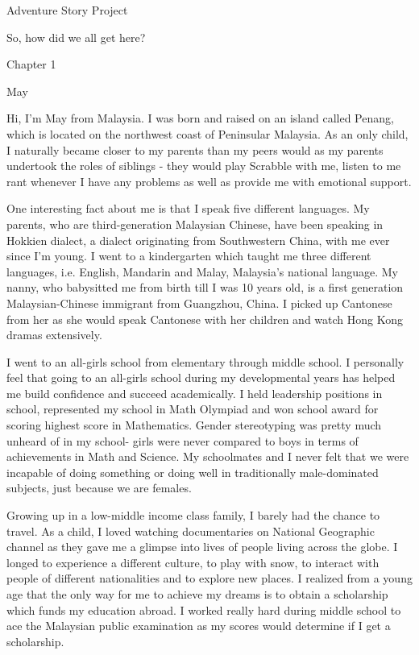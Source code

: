 \documentclass{article}
\begin{document}
\Huge Adventure Story Project

So, how did we all get here?

Chapter 1

May

Hi, I'm May from Malaysia. I was born and raised on an island called Penang, which is located on the northwest coast of Peninsular  Malaysia. As an only child, I naturally became closer to my parents than my peers would as my parents undertook the roles of siblings - they would play Scrabble with me, listen to me rant whenever I have any problems as well as provide me with emotional support. 

One interesting fact about me is that I speak five different languages. My parents, who are third-generation Malaysian Chinese, have been speaking in Hokkien dialect, a dialect originating from Southwestern China,  with me ever since I’m young. I went to a kindergarten which taught me three different languages, i.e. English, Mandarin and Malay, Malaysia’s national language. My nanny, who babysitted me from birth till I was 10 years old, is a first generation Malaysian-Chinese immigrant from Guangzhou, China.  I picked up Cantonese from her as she would speak Cantonese with her children and watch Hong Kong dramas extensively. 

I went to an all-girls school from elementary through middle school. I personally feel that going to an all-girls school during my developmental years has helped me build confidence and succeed academically. I held leadership positions in school, represented my school in Math Olympiad and won school award for scoring highest score in Mathematics. Gender stereotyping was pretty much unheard of in my school- girls were never compared to boys in terms of achievements in Math and Science. My schoolmates and I never felt that we were incapable of doing something or doing well in traditionally male-dominated subjects, just because we are females. 

Growing up in a low-middle income class family, I barely had the chance to travel. As a child, I loved watching documentaries on National Geographic channel as they gave me a glimpse into lives of people living across the globe. I longed to experience a different culture, to play with snow, to interact with people of different nationalities and to explore new places. I realized from a young age that the only way for me to achieve my dreams is to obtain a scholarship which funds my education abroad. I worked really hard during middle school to ace the Malaysian public examination as my scores would determine if I get a scholarship. 
\end{document}
